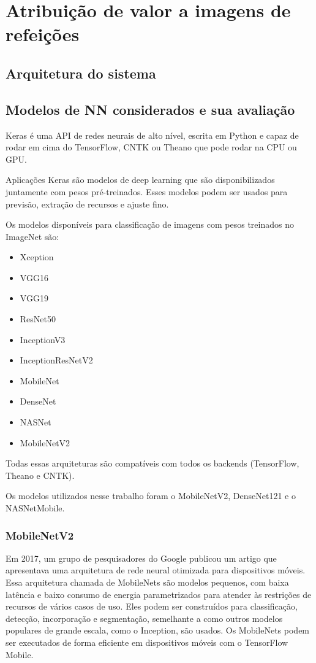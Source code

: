 \section{Atribuição de valor a imagens de refeições}

\subsection{Arquitetura do sistema}


\subsection{Modelos de NN considerados e sua avaliação}

Keras é uma API de redes neurais de alto nível, escrita em Python e capaz de rodar em cima do TensorFlow, CNTK ou Theano que pode rodar na CPU ou GPU.

Aplicações Keras são modelos de deep learning que são disponibilizados juntamente com pesos pré-treinados. Esses modelos podem ser usados para previsão, extração de recursos e ajuste fino.

Os modelos disponíveis para classificação de imagens com pesos treinados no ImageNet são:

\begin{itemize}
    \item Xception
    \item VGG16
    \item VGG19
    \item ResNet50
    \item InceptionV3
    \item InceptionResNetV2
    \item MobileNet
    \item DenseNet
    \item NASNet
    \item MobileNetV2
\end{itemize}

Todas essas arquiteturas são compatíveis com todos os backends (TensorFlow, Theano e CNTK).

Os modelos utilizados nesse trabalho foram o MobileNetV2, DenseNet121 e o NASNetMobile.

\subsubsection{MobileNetV2}
Em 2017, um grupo de pesquisadores do Google publicou um artigo que apresentava uma arquitetura de rede neural otimizada para dispositivos móveis. Essa arquitetura chamada de MobileNets são modelos pequenos, com baixa latência e baixo consumo de energia parametrizados para atender às restrições de recursos de vários casos de uso. Eles podem ser construídos para classificação, detecção, incorporação e segmentação, semelhante a como outros modelos populares de grande escala, como o Inception, são usados. Os MobileNets podem ser executados de forma eficiente em dispositivos móveis com o TensorFlow Mobile.

